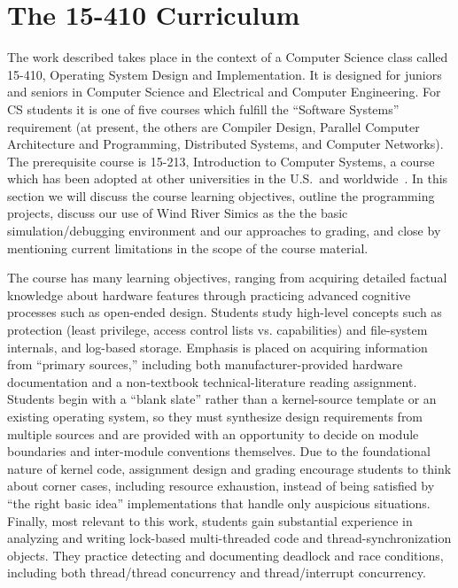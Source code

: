 \section{The 15-410 Curriculum}
\label{sec:curriculum}

The work described takes place in the context of a
Computer Science class called
15-410, Operating System Design and Implementation.
It is designed for juniors and seniors in Computer Science
and Electrical and Computer Engineering.
For CS students it is one of five courses which fulfill
the ``Software Systems'' requirement (at present, the others
are Compiler Design,
Parallel Computer Architecture and Programming,
Distributed Systems,
and Computer Networks).
The prerequisite course is 15-213,
Introduction to Computer Systems,
a course which has been adopted at other
universities in the U.S.\ and worldwide~\cite{sigcse01:CSaPP}.
In this section we will discuss the course learning
objectives,
outline the programming projects,
discuss our use of Wind River Simics as the
the basic simulation/debugging environment
and our approaches to grading,
and close by mentioning current limitations in the scope
of the course material.

The course has many learning objectives,
ranging from acquiring detailed factual knowledge about
hardware features
through practicing advanced cognitive processes
such as open-ended design.
%
Students study high-level concepts
such as protection (least privilege, access control lists vs.
capabilities)
and
file-system internals,
and log-based storage.
%
Emphasis is placed on acquiring information from ``primary sources,''
including both manufacturer-provided hardware documentation
and a non-textbook technical-literature reading assignment.
%
Students begin with a ``blank slate'' rather than a
kernel-source template or an existing operating system,
so they must synthesize design requirements from multiple sources
and are provided with an opportunity to 
decide on module boundaries and inter-module conventions
themselves.
%
Due to the foundational nature of kernel code,
assignment design and grading encourage students to
think about corner cases, including resource exhaustion,
instead of being satisfied by ``the right basic idea''
implementations that handle only auspicious situations.
%
Finally, most relevant to this work,
students gain substantial experience in
analyzing and writing lock-based multi-threaded code and
thread-synchronization objects.
They practice detecting and documenting deadlock and race conditions,
including both thread/thread concurrency and thread/interrupt concurrency.

